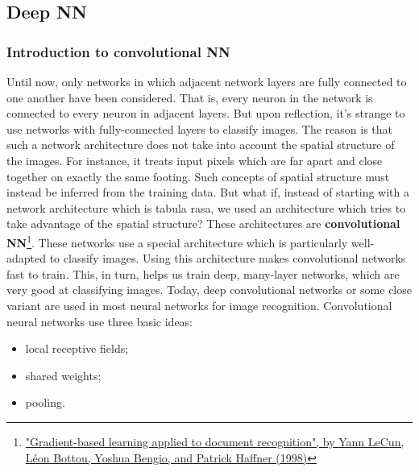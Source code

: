 \documentclass[12pt, letterpaper]{article}
\theoremstyle{definition}
\let\tb\textbf
\begin{document}
\subsection{Deep NN}

\subsubsection{Introduction to convolutional NN}
Until now, only networks in which adjacent network layers are fully connected to one another have been considered. That is, every neuron in the network is connected to every neuron in adjacent layers. But upon reflection, it's strange to use networks with fully-connected layers to classify images. The reason is that such a network architecture does not take into account the spatial structure of the images. For instance, it treats input pixels which are far apart and close together on exactly the same footing. Such concepts of spatial structure must instead be inferred from the training data. But what if, instead of starting with a network architecture which is tabula rasa, we used an architecture which tries to take advantage of the spatial structure? These architectures are \tb{convolutional NN}\footnote{\href{http://yann.lecun.com/exdb/publis/pdf/lecun-98.pdf}{ "Gradient-based learning applied to document recognition", by Yann LeCun, Léon Bottou, Yoshua Bengio, and Patrick Haffner (1998)}}. These networks use a special architecture which is particularly well-adapted to classify images. Using this architecture makes convolutional networks fast to train. This, in turn, helps us train deep, many-layer networks, which are very good at classifying images. Today, deep convolutional networks or some close variant are used in most neural networks for image recognition.
Convolutional neural networks use three basic ideas: 

\begin{itemize}
\item local receptive fields;
\item shared weights;
\item pooling.
\end{itemize}
\end{document}
